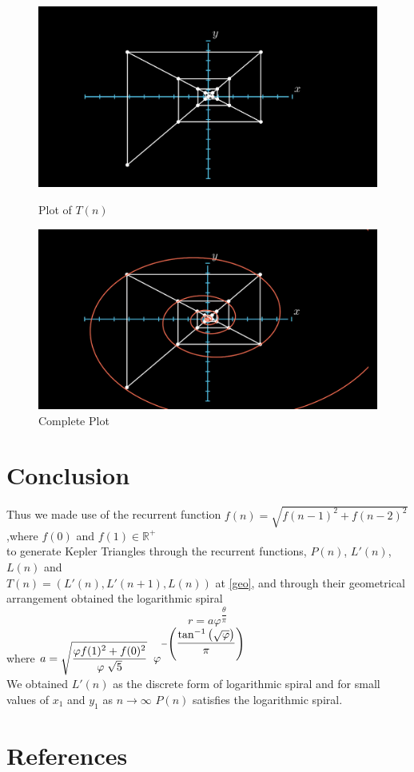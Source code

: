 \documentclass[preprint,12pt]{elsarticle}
\begin{document}
	\begin{figure}[t]
		\centering
		\begin{minipage}{0.45\textwidth}
			\centering
			\includegraphics[scale=0.23, trim={3cm 0 6cm 0}, clip]{images/GFKT7.png}
			\caption{Plot of $T(n)$}
		\end{minipage}\hfill
		\begin{minipage}{0.45\textwidth}
			\centering
			\includegraphics[scale=0.23, trim={3cm 0 6cm 0}, clip]{images/GFKT8.png}
			\caption{Complete Plot}
		\end{minipage}
	\end{figure}
	\clearpage
	\section{Conclusion}
	Thus we made use of the recurrent function $f(n) = \sqrt{f(n-1)^2 + f(n-2)^2}$,where  $f(0)$ and $f(1) \in \mathbb{R}^{+}$\\ to generate Kepler Triangles through the recurrent functions, $P(n)$, $L'(n)$, $L(n)$ and\\ $T(n) = (L'(n), L'(n+1), L(n))$ at \ref{geo}, and through their geometrical arrangement obtained the logarithmic spiral {\large$$r = a\varphi^{\dfrac{\theta}{\pi}}$$}
	where $a = \sqrt{\dfrac{\varphi f(1)^2 + f(0)^2}{\varphi\hspace{1mm}\sqrt{5}}}\hspace{2mm}\varphi^{-\left(\dfrac{ \tan^{-1}{\left(\sqrt{\varphi}\right)}}{\pi}\right)}$\\
	We obtained $L'(n)$ as the discrete form of logarithmic spiral and for small values of $x_1$ and $y_1$ as $n \to \infty$ $P(n)$ satisfies the logarithmic spiral.
	
	\section*{References}
	
	
	
\end{document}

